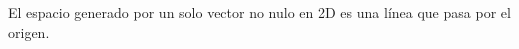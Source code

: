 \documentclass[preview]{standalone}
\begin{document}
\begin{center}
El espacio generado por un solo vector no nulo en 2D es una línea que pasa por el origen.
\end{center}
\end{document}
